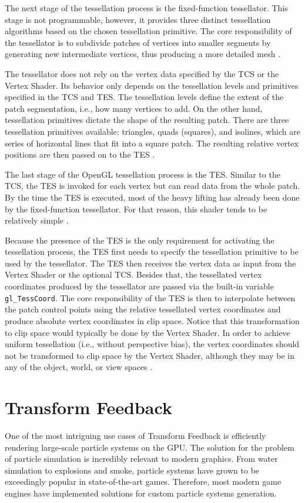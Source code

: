 \documentclass[
  digital,     %
  oneside,     %
  nosansbold,  %
  nocolorbold, %
  lof,         %
  lot,         %
]{fithesis4}
\begin{document}
The next stage of the tessellation process is the fixed-function tessellator. This stage is not
programmable, however, it provides three distinct tessellation algorithms based on the chosen
tessellation primitive. The core responsibility of the tessellator is to subdivide patches of vertices
into smaller segments by generating new intermediate vertices, thus producing a more detailed
mesh \cite{openglwiki-tessellation}.

The tessellator does not rely on the vertex data specified by the TCS or the
Vertex Shader. Its behavior only depends on the tessellation levels and primitives specified in the
TCS and TES. The tessellation levels define the extent of the patch segmentation, i.e.,
how many vertices to add. On the other hand, tessellation primitives dictate the shape of the
resulting patch. There are three tessellation primitives available: triangles, quads (squares), and
isolines, which are series of horizontal lines that fit into a square patch. The resulting relative vertex
positions are then passed on to the TES \cite{openglwiki-tessellation}.

The last stage of the OpenGL tessellation process is the TES. Similar to the
TCS, the TES is invoked for each vertex but can read data from the whole
patch. By the time the TES is executed, most of the heavy lifting has already been done by the fixed-function tessellator. For that reason, this shader tends to be relatively simple \cite{openglwiki-tessellation}.

Because the presence of the TES is the only requirement for activating the tessellation process, the
TES first needs to specify the tessellation primitive to be used by the tessellator. The TES then
receives the vertex data as input from the Vertex Shader or the optional TCS.
Besides that, the tessellated vertex coordinates produced by the tessellator are passed via the built-in variable \verb|gl_TessCoord|. The core responsibility of the TES is then to interpolate between
the patch control points using the relative tessellated vertex coordinates and produce absolute vertex
coordinates in clip space. Notice that this transformation to clip space would typically be done by
the Vertex Shader. In order to achieve uniform tessellation (i.e., without perspective bias),
the vertex coordinates should not be transformed to clip space by the Vertex Shader,
although they may be in any of the object, world, or view spaces
\cite{learnopengl-tessellation}\cite{openglwiki-tessellation}.

\chapter{Transform Feedback}\label{app:transform-feedback}
One of the most intriguing use cases of Transform Feedback is efficiently rendering large-scale particle systems on the GPU.
The solution for the problem of particle simulation is incredibly relevant to modern graphics. From water simulation
to explosions and smoke, particle systems have grown to be exceedingly popular in state-of-the-art games. Therefore,
most modern game engines have implemented solutions for custom particle systems generation.
\end{document}
